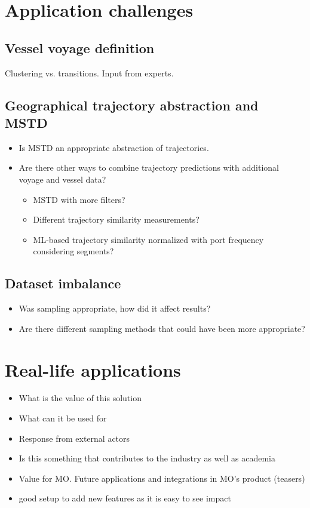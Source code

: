 \section{Application challenges}

\subsection{Vessel voyage definition}

Clustering vs. transitions. Input from experts.

\subsection{Geographical trajectory abstraction and MSTD}
\begin{itemize}
    \item Is MSTD an appropriate abstraction of trajectories.
    \item Are there other ways to combine trajectory predictions with additional voyage and vessel data?
    \begin{itemize}
        \item MSTD with more filters?
        \item Different trajectory similarity measurements?
        \item ML-based trajectory similarity normalized with port frequency considering segments?
    \end{itemize}
\end{itemize}

\subsection{Dataset imbalance}
\begin{itemize}
    \item Was sampling appropriate, how did it affect results?
    \item Are there different sampling methods that could have been more appropriate?
\end{itemize}

\section{Real-life applications}

\begin{itemize}
    \item What is the value of this solution
    \item What can it be used for
    \item Response from external actors
    \item Is this something that contributes to the industry as well as academia
    \item Value for MO\@. Future applications and integrations in MO's product (teasers)
    \item good setup to add new features as it is easy to see impact
\end{itemize}

